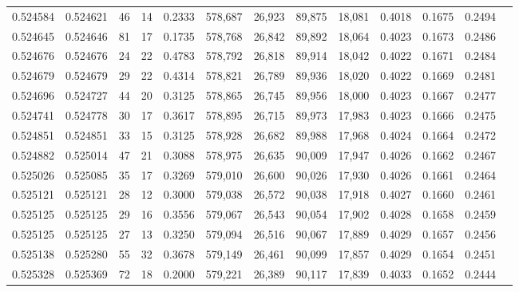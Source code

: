 \begin{tabular}{rrrrrrrrrrrrr}
0.524584 & 0.524621 &    46 &    14 &                                     0.2333 & 578,687 &  26,923 &  89,875 &  18,081 & 0.4018 & 0.1675 & 0.2494 \\
0.524645 & 0.524646 &    81 &    17 &                                     0.1735 & 578,768 &  26,842 &  89,892 &  18,064 & 0.4023 & 0.1673 & 0.2486 \\
0.524676 & 0.524676 &    24 &    22 &                                     0.4783 & 578,792 &  26,818 &  89,914 &  18,042 & 0.4022 & 0.1671 & 0.2484 \\
0.524679 & 0.524679 &    29 &    22 &                                     0.4314 & 578,821 &  26,789 &  89,936 &  18,020 & 0.4022 & 0.1669 & 0.2481 \\
0.524696 & 0.524727 &    44 &    20 &                                     0.3125 & 578,865 &  26,745 &  89,956 &  18,000 & 0.4023 & 0.1667 & 0.2477 \\
0.524741 & 0.524778 &    30 &    17 &                                     0.3617 & 578,895 &  26,715 &  89,973 &  17,983 & 0.4023 & 0.1666 & 0.2475 \\
0.524851 & 0.524851 &    33 &    15 &                                     0.3125 & 578,928 &  26,682 &  89,988 &  17,968 & 0.4024 & 0.1664 & 0.2472 \\
0.524882 & 0.525014 &    47 &    21 &                                     0.3088 & 578,975 &  26,635 &  90,009 &  17,947 & 0.4026 & 0.1662 & 0.2467 \\
0.525026 & 0.525085 &    35 &    17 &                                     0.3269 & 579,010 &  26,600 &  90,026 &  17,930 & 0.4026 & 0.1661 & 0.2464 \\
0.525121 & 0.525121 &    28 &    12 &                                     0.3000 & 579,038 &  26,572 &  90,038 &  17,918 & 0.4027 & 0.1660 & 0.2461 \\
0.525125 & 0.525125 &    29 &    16 &                                     0.3556 & 579,067 &  26,543 &  90,054 &  17,902 & 0.4028 & 0.1658 & 0.2459 \\
0.525125 & 0.525125 &    27 &    13 &                                     0.3250 & 579,094 &  26,516 &  90,067 &  17,889 & 0.4029 & 0.1657 & 0.2456 \\
0.525138 & 0.525280 &    55 &    32 &                                     0.3678 & 579,149 &  26,461 &  90,099 &  17,857 & 0.4029 & 0.1654 & 0.2451 \\
0.525328 & 0.525369 &    72 &    18 &                                     0.2000 & 579,221 &  26,389 &  90,117 &  17,839 & 0.4033 & 0.1652 & 0.2444 \\

\end{tabular}
